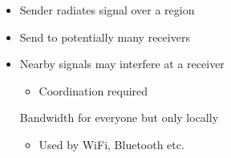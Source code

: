 \begin{itemize}
\begin{itemize}
\begin{itemize}
                \end{itemize}
        \end{itemize}
        \begin{itemize}
            \item Sender radiates signal over a region
            \item Send to potentially many receivers
            \item Nearby signals may interfere at a receiver
                \begin{itemize}
                    \item Coordination required
                \end{itemize}
             Bandwidth for everyone but only locally
                \begin{itemize}
                    \item Used by WiFi, Bluetooth etc.
                \end{itemize}
        \end{itemize}
\end{itemize}

